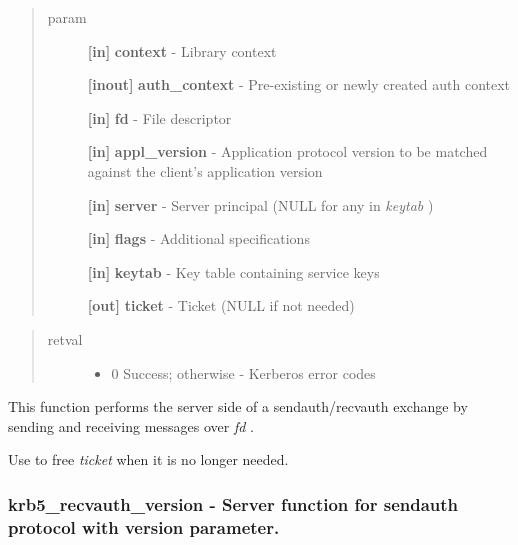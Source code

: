 \documentclass[letterpaper,10pt,english]{sphinxmanual}
\begin{document}
\begin{quote}\begin{description}
\item[{param}] \leavevmode
\textbf{{[}in{]}} \textbf{context} - Library context

\textbf{{[}inout{]}} \textbf{auth\_context} - Pre-existing or newly created auth context

\textbf{{[}in{]}} \textbf{fd} - File descriptor

\textbf{{[}in{]}} \textbf{appl\_version} - Application protocol version to be matched against the client's application version

\textbf{{[}in{]}} \textbf{server} - Server principal (NULL for any in \emph{keytab} )

\textbf{{[}in{]}} \textbf{flags} - Additional specifications

\textbf{{[}in{]}} \textbf{keytab} - Key table containing service keys

\textbf{{[}out{]}} \textbf{ticket} - Ticket (NULL if not needed)

\end{description}\end{quote}
\begin{quote}\begin{description}
\item[{retval}] \leavevmode\begin{itemize}
\item {} 
0   Success; otherwise - Kerberos error codes

\end{itemize}

\end{description}\end{quote}

This function performs the server side of a sendauth/recvauth exchange by sending and receiving messages over \emph{fd} .

Use {\hyperref[appdev/refs/api/krb5_free_ticket:c.krb5_free_ticket]{}} to free \emph{ticket} when it is no longer needed.




{\hyperref[appdev/refs/api/krb5_sendauth:c.krb5_sendauth]{}}




\subsubsection{krb5\_recvauth\_version -  Server function for sendauth protocol with version parameter.}
\label{appdev/refs/api/krb5_recvauth_version::doc}\label{appdev/refs/api/krb5_recvauth_version:krb5-recvauth-version-server-function-for-sendauth-protocol-with-version-parameter}
\end{document}
